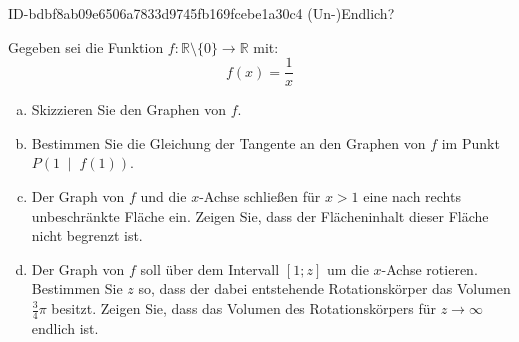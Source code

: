 \begin{exercise}
      {ID-bdbf8ab09e6506a7833d9745fb169fcebe1a30c4}
      {(Un-)Endlich?}
  \ifproblem\problem\par
    Gegeben sei die Funktion
    $f:\mathbb{R}\setminus\{0\}\to\mathbb{R}$ mit:
    \begin{equation*}
      f(x)=\frac{1}{x}
    \end{equation*}
    \begin{enumerate}[a)]
      \item Skizzieren Sie den Graphen von $f$.
      \item Bestimmen Sie die Gleichung der Tangente
            an den Graphen von $f$ im Punkt
            $P\left(1\;\middle|\;f(1)\right)$.
      \item Der Graph von $f$ und die $x$-Achse
            schließen für $x>1$ eine nach rechts
            unbeschränkte Fläche ein.
            Zeigen Sie, dass der Flächeninhalt dieser
            Fläche nicht begrenzt ist.
      \item Der Graph von $f$ soll über dem Intervall
            $[1;z]$ um die $x$-Achse rotieren.
            Bestimmen Sie $z$ so, dass der dabei
            entstehende Rotationskörper das Volumen
            $\frac{3}{4}\pi$ besitzt.
            Zeigen Sie, dass das Volumen des
            Rotationskörpers für $z\to\infty$
            endlich ist.
    \end{enumerate}
  \fi
\end{exercise}
